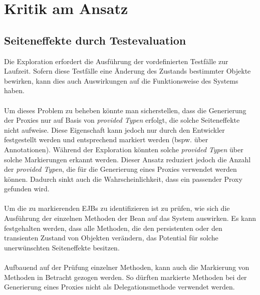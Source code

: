 \section{Kritik am Ansatz}\label{sec_discApproach}

\subsection{Seiteneffekte durch Testevaluation}\label{sec_sideeffects}
Die Exploration erfordert die Ausführung der vordefinierten Testfälle zur Laufzeit. Sofern diese Testfälle eine Änderung des Zustands bestimmter Objekte bewirken, kann dies auch Auswirkungen auf die Funktionsweise des Systems haben. 
\\\\
Um dieses Problem zu beheben könnte man sicherstellen, dass die Generierung der Proxies nur auf Basis von \emph{provided Typen} erfolgt, die solche Seiteneffekte nicht aufweise. Diese Eigenschaft kann jedoch nur durch den Entwickler festgestellt werden und entsprechend markiert werden (bspw. über Annotationen). Während der Exploration könnten solche \emph{provided Typen} über solche Markierungen erkannt werden. Dieser Ansatz reduziert jedoch die Anzahl der \emph{provided Typen}, die für die Generierung eines Proxies verwendet werden können. Dadurch sinkt auch die Wahrscheinlichkeit, dass ein passender Proxy gefunden wird.
\\\\
Um die zu markierenden EJBs zu identifizieren ist zu prüfen, wie sich die Ausführung der einzelnen Methoden der Bean auf das System auswirken. Es kann festgehalten werden, dass alle Methoden, die den persistenten oder den transienten Zustand von Objekten verändern, das Potential für solche unerwünschten Seiteneffekte besitzen. 
\\\\
Aufbauend auf der Prüfung einzelner Methoden, kann auch die Markierung von Methoden in Betracht gezogen werden. So dürften markierte Methoden bei der Generierung eines Proxies nicht als Delegationsmethode verwendet werden.
